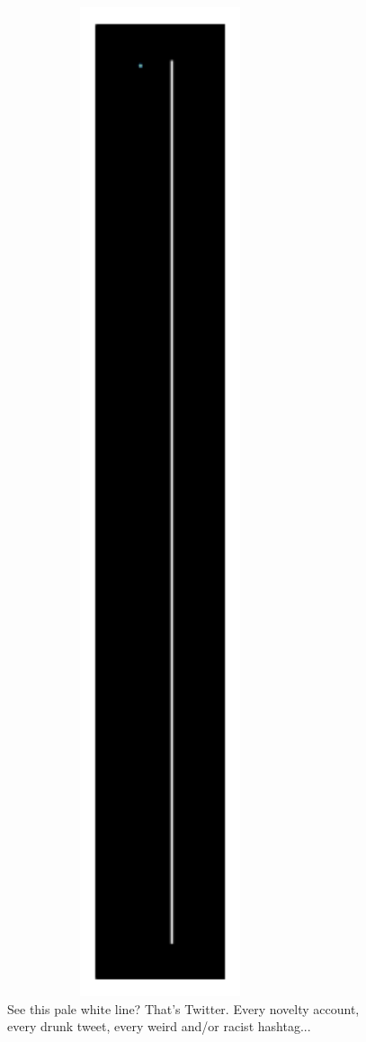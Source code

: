{\begin{figure}[!htbp]
\centering
\includegraphics[scale=0.5, max width=0.8\textwidth]{imgs/a/65/timeline_earth.png}
\caption{See this pale white line?  That's Twitter.  Every novelty account, every drunk tweet, every weird and/or racist hashtag...}
\end{figure}

}
